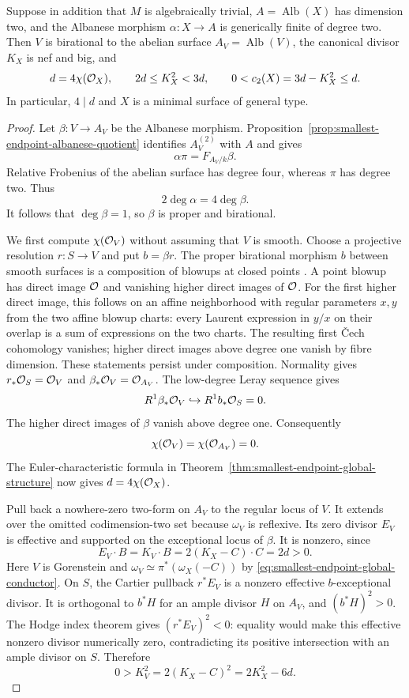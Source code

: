 \begin{proposition}
\label{prop:smallest-endpoint-albanese-degree-two}
Suppose in addition that $M$ is algebraically trivial,
$A=\operatorname{Alb}(X)$ has dimension two, and the Albanese
morphism $\alpha:X\to A$ is generically finite of degree two.
Then $V$ is birational to the abelian surface
$A_V=\operatorname{Alb}(V)$, the canonical divisor $K_X$ is nef
and big, and
\begin{equation}\label{eq:smallest-endpoint-albanese-chern-interval}
 d=4\chi(\mathcal O_X),\qquad
 2d\le K_X^2<3d,\qquad
 0<c_2(X)=3d-K_X^2\le d.
\end{equation}
In particular, $4\mid d$ and $X$ is a minimal surface of general type.
\end{proposition}

\begin{proof}
Let $\beta:V\to A_V$ be the Albanese morphism.
Proposition~\ref{prop:smallest-endpoint-albanese-quotient}
identifies $A_V^{(2)}$ with $A$ and gives
\[
 \alpha\pi=F_{A_V/k}\beta.
\]
Relative Frobenius of the abelian surface has degree four, whereas
$\pi$ has degree two.  Thus
\[
 2\deg\alpha=4\deg\beta.
\]
It follows that $\deg\beta=1$, so $\beta$ is proper and birational.

We first compute $\chi(\mathcal O_V)$ without assuming that $V$ is smooth.
Choose a projective resolution $r:S\to V$ and put $b=\beta r$.
The proper birational morphism $b$ between smooth surfaces is a
composition of blowups at closed points
\cite[Lemma~54.17.1, Tag~0C5Q]{Stacks}.
A point blowup has direct image $\mathcal O$ and vanishing higher direct
images of $\mathcal O$.  For the first higher direct image, this follows
on an affine neighborhood with regular parameters $x,y$ from the
two affine blowup charts: every Laurent expression in $y/x$ on
their overlap is a sum of expressions on the two charts.
The resulting first \v{C}ech cohomology vanishes; higher direct
images above degree one vanish by fibre dimension.
These statements persist under composition.
Normality gives $r_*\mathcal O_S=\mathcal O_V$ and
$\beta_*\mathcal O_V=\mathcal O_{A_V}$.
The low-degree Leray sequence gives
\[
 R^1\beta_*\mathcal O_V\hookrightarrow R^1b_*\mathcal O_S=0.
\]
The higher direct images of $\beta$ vanish above degree one.
Consequently
\[
 \chi(\mathcal O_V)=\chi(\mathcal O_{A_V})=0.
\]
The Euler-characteristic formula in
Theorem~\ref{thm:smallest-endpoint-global-structure} now gives
$d=4\chi(\mathcal O_X)$.

Pull back a nowhere-zero two-form on $A_V$ to the regular locus
of $V$.  It extends over the omitted codimension-two set because
$\omega_V$ is reflexive.  Its zero divisor $E_V$ is effective
and supported on the exceptional locus of $\beta$.
It is nonzero, since
\[
 E_V\cdot B=K_V\cdot B
 =2(K_X-C)\cdot C=2d>0.
\]
Here $V$ is Gorenstein and
$\omega_V\simeq\pi^*(\omega_X(-C))$ by
\eqref{eq:smallest-endpoint-global-conductor}.
On $S$, the Cartier pullback $r^*E_V$ is a nonzero effective
$b$-exceptional divisor.  It is orthogonal to $b^*H$ for an ample
divisor $H$ on $A_V$, and $(b^*H)^2>0$.
The Hodge index theorem gives $(r^*E_V)^2<0$: equality would make
this effective nonzero divisor numerically zero, contradicting
its positive intersection with an ample divisor on $S$.
Therefore
\[
 0>K_V^2=2(K_X-C)^2=2K_X^2-6d.
\]


\end{proof}
